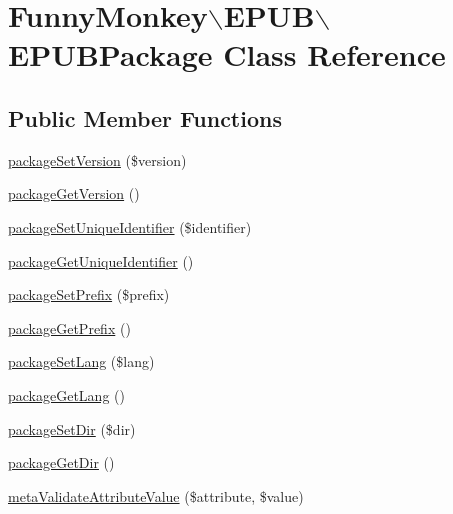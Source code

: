\hypertarget{classFunnyMonkey_1_1EPUB_1_1EPUBPackage}{\section{\-Funny\-Monkey$\backslash$\-E\-P\-U\-B$\backslash$\-E\-P\-U\-B\-Package \-Class \-Reference}
\label{classFunnyMonkey_1_1EPUB_1_1EPUBPackage}
}
\subsection*{\-Public \-Member \-Functions}
\begin{DoxyCompactItemize}
\item 
\hyperlink{classFunnyMonkey_1_1EPUB_1_1EPUBPackage_a6076057e07ef199d85f2ebfe1ad0c020}{package\-Set\-Version} (\$version)
\item 
\hyperlink{classFunnyMonkey_1_1EPUB_1_1EPUBPackage_abe97096f0c1d7c8b88f63bba953315eb}{package\-Get\-Version} ()
\item 
\hyperlink{classFunnyMonkey_1_1EPUB_1_1EPUBPackage_a6a2c8deb3b0cc123918210fea36c4930}{package\-Set\-Unique\-Identifier} (\$identifier)
\item 
\hyperlink{classFunnyMonkey_1_1EPUB_1_1EPUBPackage_a78438340a0b535ec7158724920ecba94}{package\-Get\-Unique\-Identifier} ()
\item 
\hyperlink{classFunnyMonkey_1_1EPUB_1_1EPUBPackage_acadf18c93132743fc09d701b1886abcb}{package\-Set\-Prefix} (\$prefix)
\item 
\hyperlink{classFunnyMonkey_1_1EPUB_1_1EPUBPackage_a9a5d5a6d904e2c8ddbfa414e95e69796}{package\-Get\-Prefix} ()
\item 
\hyperlink{classFunnyMonkey_1_1EPUB_1_1EPUBPackage_abcfceaaad9d26f2b18c9e189544a2393}{package\-Set\-Lang} (\$lang)
\item 
\hyperlink{classFunnyMonkey_1_1EPUB_1_1EPUBPackage_a61c4a933223af08c7017e419df221fe6}{package\-Get\-Lang} ()
\item 
\hyperlink{classFunnyMonkey_1_1EPUB_1_1EPUBPackage_a92fb948554205c83479847d3299d7424}{package\-Set\-Dir} (\$dir)
\item 
\hyperlink{classFunnyMonkey_1_1EPUB_1_1EPUBPackage_a8934ebbb9f9fd383be8f47475b6035df}{package\-Get\-Dir} ()
\item 
\hyperlink{classFunnyMonkey_1_1EPUB_1_1EPUBPackage_af72609f38b84949f79e57e00ce9808df}{meta\-Validate\-Attribute\-Value} (\$attribute, \$value)

\end{DoxyCompactItemize}
